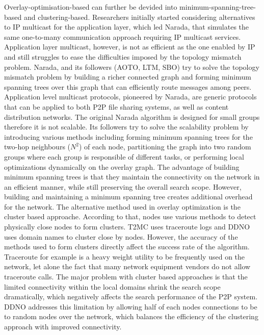 \documentclass[acmcsur,acmnow]{acmtrans2m}
\begin{document}
Overlay-optimisation-based  can further be devided into minimum-spanning-tree-based and clustering-based. Researchers initially started considering alternatives to IP multicast for the application layer, which led Narada, that simulates the same one-to-many communication approach requiring IP multicast services. Application layer multicast, however, is not as efficient as the one enabled by IP and still struggles to ease the difficulties imposed by the topology mismatch problem. Narada, and its followers (AOTO, LTM, SBO) try to solve the topology mismatch problem by building a richer connected graph and forming minimum spanning trees over this graph that can efficiently route messages among peers. Application level multicast protocols, pioneered by Narada, are generic protocols that can be applied to both P2P file sharing systems, as well as content distribution networks. The original Narada algorithm is designed for small groups therefore it is not scalable. Its followers try to solve the scalability problem by introducing
various methods including forming minimum spanning trees for the two-hop neighbours ($N^2$) of each node, partitioning the graph into two random groups where each group is
responsible of different tasks, or performing local optimizations dynamically on
the overlay graph. The advantage of building minimum spanning trees is that they maintain the connectivity on the network in an efficient manner, while
still preserving the overall search scope. However, building and maintaining a
minimum spanning tree creates additional overhead for the network. 
The alternative method used in overlay optimization is the cluster based
approache. According to that, nodes use various methods to detect
physically close nodes to form clusters. T2MC uses traceroute logs and DDNO uses
domain names to cluster close by nodes. However, the accuracy of the methods
used to form clusters directly affect the success rate of the algorithm. Traceroute for
example is a heavy weight utility to be frequently used on the network, let alone the fact that many network equipment vendors do not allow traceroute calls. The major problem with
cluster based approaches is that the limited connectivity within the local
domains shrink the search scope dramatically, which negatively affects the
search performance of the P2P system. DDNO addresses this limitation by allowing
half of each nodes connections to be to random nodes over the network, which
balances the efficiency of the clustering approach with improved connectivity.
\end{document}
